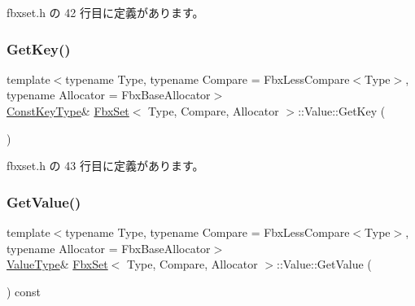  fbxset.\+h の 42 行目に定義があります。

\mbox{\label{class_fbx_set_1_1_value_a9fe85101a41e5883c6f0d7fc8eaa4cf3}} 
\subsubsection{\texorpdfstring{Get\+Key()}{GetKey()}\hspace{0.1cm}{\footnotesize\ttfamily [2/2]}}
{\footnotesize\ttfamily template$<$typename Type, typename Compare = Fbx\+Less\+Compare$<$\+Type$>$, typename Allocator = Fbx\+Base\+Allocator$>$ \\
\hyperlink{class_fbx_set_1_1_value_a184e74f6d42151d97b2c1381b5f642e7}{Const\+Key\+Type}\& \hyperlink{class_fbx_set}{Fbx\+Set}$<$ Type, Compare, Allocator $>$\+::Value\+::\+Get\+Key (\begin{DoxyParamCaption}{ }\end{DoxyParamCaption})\hspace{0.3cm}{\ttfamily [inline]}}



 fbxset.\+h の 43 行目に定義があります。

\mbox{\label{class_fbx_set_1_1_value_a6043b78df834e7911e14e7bcd76889cc}} 
\subsubsection{\texorpdfstring{Get\+Value()}{GetValue()}\hspace{0.1cm}{\footnotesize\ttfamily [1/2]}}
{\footnotesize\ttfamily template$<$typename Type, typename Compare = Fbx\+Less\+Compare$<$\+Type$>$, typename Allocator = Fbx\+Base\+Allocator$>$ \\
\hyperlink{class_fbx_set_1_1_value_aa4757d6676c438c18ab271c57997d8eb}{Value\+Type}\& \hyperlink{class_fbx_set}{Fbx\+Set}$<$ Type, Compare, Allocator $>$\+::Value\+::\+Get\+Value (\begin{DoxyParamCaption}{ }\end{DoxyParamCaption}) const\hspace{0.3cm}{\ttfamily [inline]}}



